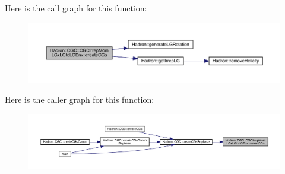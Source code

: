 Here is the call graph for this function\+:\nopagebreak
\begin{figure}[H]
\begin{center}
\leavevmode
\includegraphics[width=350pt]{dd/d8a/namespaceHadron_1_1CGC_1_1CGCIrrepMomLGxLGtoLGEnv_aac28a74a71012455c31bc9ba558b35da_cgraph}
\end{center}
\end{figure}
Here is the caller graph for this function\+:
\nopagebreak
\begin{figure}[H]
\begin{center}
\leavevmode
\includegraphics[width=350pt]{dd/d8a/namespaceHadron_1_1CGC_1_1CGCIrrepMomLGxLGtoLGEnv_aac28a74a71012455c31bc9ba558b35da_icgraph}
\end{center}
\end{figure}
